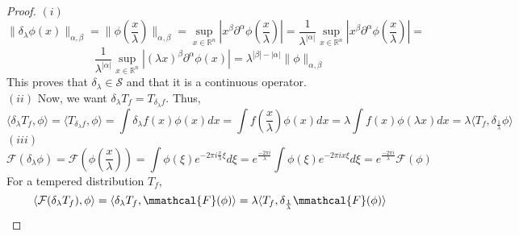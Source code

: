 \documentclass[12pt]{article}
\begin{document}
\begin{proof}
  $(i)$
  $$\|\delta_{\lambda} \phi(x)\|_{\alpha, \beta} = \|\phi(\frac{x}{\lambda})\|_{\alpha, \beta} = \sup_{x \in \mathbb{R}^n} |x^{\beta} \partial^{\alpha} \phi(\frac{x}{\lambda})| = \frac{1}{\lambda^{|\alpha|}} \sup_{x \in \mathbb{R}^n} |x^{\beta} \partial^{\alpha} \phi(\frac{x}{\lambda})| =$$ $$\frac{1}{\lambda^{|\alpha|}} \sup_{x \in \mathbb{R}^n} |(\lambda x)^{\beta} \partial^{\alpha} \phi(x)| = \lambda^{|\beta| - |\alpha|} \|\phi\|_{\alpha, \beta}$$
  This proves that $\delta_{\lambda} \in \mathcal{S}$ and that it is a continuous operator.\\
  $(ii)$ Now, we want $\delta_{\lambda}T_f = T_{\delta_{\lambda}f}$. Thus,
  $$\langle \delta_{\lambda}T_f, \phi \rangle = \langle T_{\delta_{\lambda}f}, \phi \rangle = \int \delta_{\lambda}f(x) \phi(x) dx = \int f(\frac{x}{\lambda}) \phi(x) dx = \lambda \int f(x) \phi(\lambda x) dx = \lambda \langle T_f, \delta_{\frac{1}{\lambda}}\phi \rangle$$
  $(iii)$\\
  $$\mathcal{F}(\delta_{\lambda}\phi) = \mathcal{F}(\phi(\frac{x}{\lambda})) = \int \phi(\xi) e^{-2 \pi i \frac{x}{\lambda} \xi} d\xi = e^{\frac{-2 \pi i}{\lambda}} \int \phi(\xi) e^{-2 \pi i x \xi} d\xi = e^{\frac{-2 \pi i}{\lambda}} \mathcal{F}(\phi)$$
  For a tempered distribution $T_f$,
  $$\langle \mathcal{F}(\delta_{\lambda} T_f), \phi \rangle = \langle \delta_{\lambda} T_f, \mmathcal{F}(\phi) \rangle = \lambda \langle T_f, \delta_{\frac{1}{\lambda}} \mmathcal{F}(\phi) \rangle$$
\end{proof}
\end{document}
